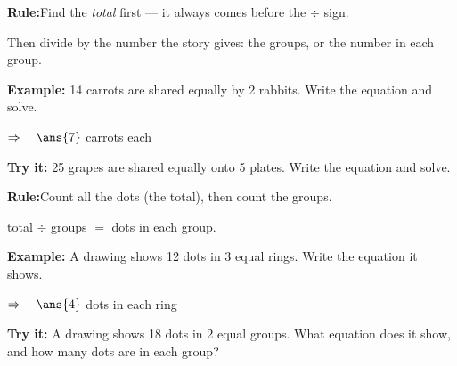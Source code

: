 \documentclass[12pt]{article}
\begin{document}


\begin{formulabox}
\textbf{Rule:}\quad Find the \emph{total} first --- it always comes before the $\div$ sign.\par
Then divide by the number the story gives: the groups, or the number in each group.
\end{formulabox}

\begin{examplebox}
\textbf{Example:} 14 carrots are shared equally by 2 rabbits. Write the equation and solve.

$\Rightarrow\quad\ans{7}$ carrots each
\end{examplebox}

\begin{tryitbox}
\textbf{Try it:} 25 grapes are shared equally onto 5 plates. Write the equation and solve.\\[2pt]
\end{tryitbox}


\begin{formulabox}
\textbf{Rule:}\quad Count all the dots (the total), then count the groups.\par
total $\div$ groups $=$ dots in each group.
\end{formulabox}

\begin{examplebox}
\textbf{Example:} A drawing shows 12 dots in 3 equal rings. Write the equation it shows.

$\Rightarrow\quad\ans{4}$ dots in each ring
\end{examplebox}

\begin{tryitbox}
\textbf{Try it:} A drawing shows 18 dots in 2 equal groups. What equation does it show, and how many dots are in each group?\\[2pt]
\end{tryitbox}
\end{document}
